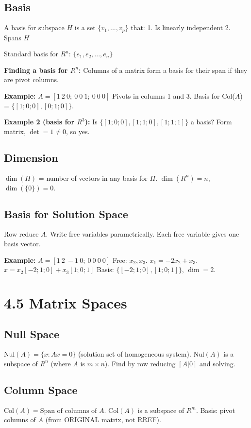 \subsection{Basis}
A basis for subspace $H$ is a set $\{v_1, ..., v_p\}$ that:
1. Is linearly independent
2. Spans $H$

Standard basis for $R^n$: $\{e_1, e_2, ..., e_n\}$

\textbf{Finding a basis for $R^n$:}
Columns of a matrix form a basis for their span if they are pivot columns.

\textbf{Example:} $A = [1\ 2\ 0;\ 0\ 0\ 1;\ 0\ 0\ 0]$
Pivots in columns 1 and 3.
Basis for Col($A$) = $\{[1;0;0], [0;1;0]\}$.

\textbf{Example 2 (basis for $R^3$):}
Is $\{[1;0;0],[1;1;0],[1;1;1]\}$ a basis?
Form matrix, $\det = 1 \neq 0$, so yes.

\subsection{Dimension}
$\dim(H)$ = number of vectors in any basis for $H$.
$\dim(R^n) = n$, $\dim(\{0\}) = 0$.

\subsection{Basis for Solution Space}
Row reduce $A$. Write free variables parametrically.
Each free variable gives one basis vector.

\textbf{Example:} $A = [1\ 2\ -1\ 0;\ 0\ 0\ 0\ 0]$
Free: $x_2, x_3$. $x_1 = -2x_2 + x_3$.
$x = x_2[-2;1;0] + x_3[1;0;1]$
Basis: $\{[-2;1;0], [1;0;1]\}$, $\dim = 2$.

\section{4.5 Matrix Spaces}

\subsection{Null Space}
$\text{Nul}(A) = \{x : Ax = 0\}$ (solution set of homogeneous system).
$\text{Nul}(A)$ is a subspace of $R^n$ (where $A$ is $m \times n$).
Find by row reducing $[A | 0]$ and solving.

\subsection{Column Space}
$\text{Col}(A) = \text{Span of columns of }A$.
$\text{Col}(A)$ is a subspace of $R^m$.
Basis: pivot columns of $A$ (from ORIGINAL matrix, not RREF).

